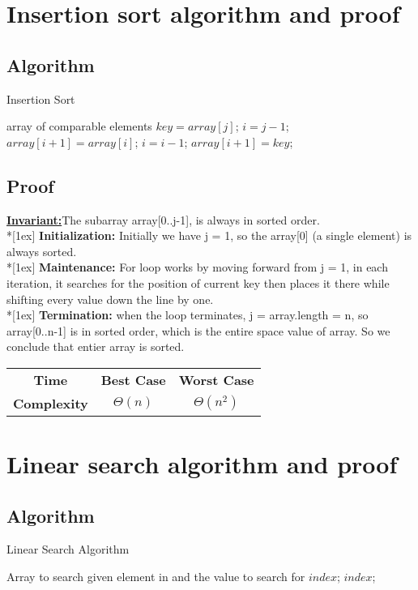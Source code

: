 \documentclass{article}
\newcommand{\Invariant}{\textbf{\underline{Invariant:}}}
\newcommand{\topic}[1]{\textbf{#1:}}
\newcommand{\ls}{\\*[1ex]}
\newcommand{\timecase}[2]{ 
    \vspace{1em}
    \begin{center}
    \begin{tabular}{ |c|c|c| }
    \hline
    \textbf{Time} & \textbf{Best Case} & \textbf{Worst Case} \\ \cline{2-3}
    \textbf{Complexity} & $\Theta \left( #1 \right)$ & $\Theta \left( #2 \right)$ \\ \cline{2-3}
    \hline
    \end{tabular}
    \end{center}
}
\begin{document}
\tableofcontents

\pagebreak

\section{Insertion sort algorithm and proof}

\subsection{Algorithm}
\begin{algorithm}
    \caption{Insertion Sort}
    \begin{algorithmic}[1]
        \Require array of comparable elements
         
        \State $key = array[j]$;
        \State $i = j - 1$;
        \State $array[i + 1] = array[i]$;
        \State $i = i - 1$;
        \EndWhile
        \State $array[i + 1] = key$;
        \EndFor
        \EndFunction
    \end{algorithmic}
\end{algorithm}

\subsection{Proof}

\Invariant The subarray array[0..j-1], is always in sorted order.
\ls
\topic{Initialization} Initially we have j = 1, so the array[0] (a single element) is always sorted.
\ls
\topic{Maintenance} For loop works by moving forward from j = 1, in each iteration, it searches for the position of current key then places it there while shifting every value down the line by one.
\ls
\topic{Termination} when the loop terminates, j = array.length = n, so array[0..n-1] is in sorted order, which is the entire space value of array. So we conclude that entier array is sorted.

\timecase{n}{n^2}

\pagebreak

\section{Linear search algorithm and proof}

\subsection{Algorithm}
\begin{algorithm}
    \caption{Linear Search Algorithm}
    \begin{algorithmic}[1]
        \Require Array to search given element in and the value to search for
        \State \Return $index$;
        \EndIf
        \EndFor
        \State \Return $index$;
        \EndFunction
    \end{algorithmic}
\end{algorithm}
\end{document}
